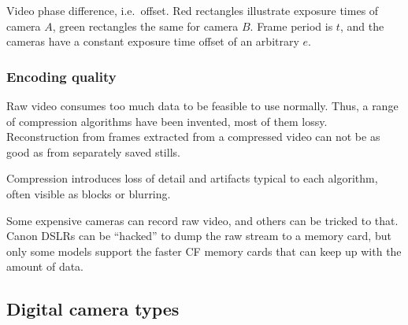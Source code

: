 %
%
%
%


{Video phase difference, i.e.~offset.
Red rectangles illustrate exposure times of camera $A$, green rectangles the same for camera $B$.
Frame period is $t$, and the cameras have a constant exposure time offset of an arbitrary $e$.}


\subsubsection{Encoding quality} %

Raw video consumes too much data to be feasible to use normally.
Thus, a range of compression algorithms have been invented, most of them lossy.
Reconstruction from frames extracted from a compressed video can not be as good as from separately saved stills.

Compression introduces loss of detail and artifacts typical to each algorithm, often visible as blocks or blurring.

Some expensive cameras can record raw video, and others can be tricked to that.
Canon DSLRs can be ``hacked'' to dump the raw stream to a memory card, but only some models support the faster CF memory cards that can keep up with the amount of data.


\subsection{Digital camera types} \label{sec:cameratypes} %

